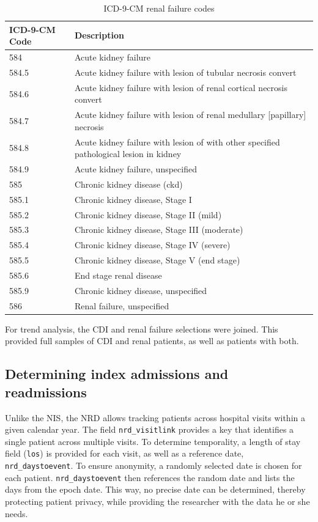 \documentclass[12pt]{ociamthesis}\usepackage[]{graphicx}\usepackage[]{color}
\begin{document}
\begin{table}[]
\centering
\begin{tabular}{ll}
ICD-9-CM Code  & Description          \\
\hline
584   & Acute kidney failure \\
584.5 &	Acute kidney failure with lesion of tubular necrosis convert \\
584.6 &	Acute kidney failure with lesion of renal cortical necrosis convert \\
584.7 &	Acute kidney failure with lesion of renal medullary [papillary] necrosis \\
584.8 &	Acute kidney failure with lesion of with other specified pathological lesion in kidney \\
584.9 &	Acute kidney failure, unspecified \\
585   & Chronic kidney disease (ckd) \\
585.1 &	Chronic kidney disease, Stage I \\
585.2 &	Chronic kidney disease, Stage II (mild) \\
585.3 &	Chronic kidney disease, Stage III (moderate) \\
585.4 &	Chronic kidney disease, Stage IV (severe) \\
585.5 &	Chronic kidney disease, Stage V (end stage) \\
585.6 &	End stage renal disease \\
585.9 &	Chronic kidney disease, unspecified \\
586   &	Renal failure, unspecified \\
\end{tabular}
\caption{ICD-9-CM renal failure codes}
\label{icd9renal}
\end{table}

For trend analysis, the CDI and renal failure selections were joined. This provided full samples of
CDI and renal patients, as well as patients with both.


\subsection{Determining index admissions and readmissions}

Unlike the NIS, the NRD allows tracking patients across hospital visits within a given calendar year.
The field \texttt{nrd\_visitlink} provides a key that identifies a single patient across multiple visits.
To determine temporality, a length of stay field (\texttt{los}) is provided for each visit, as well as
a reference date, \texttt{nrd\_daystoevent}. To ensure anonymity, a randomly selected date is chosen for 
each patient. \texttt{nrd\_daystoevent} then references the random date and lists the days from the epoch date.
This way, no precise date can be determined, thereby protecting patient privacy, while providing the researcher
with the data he or she needs. 
\end{document}
